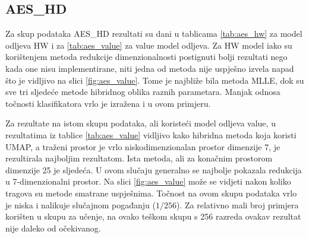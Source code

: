 \documentclass[times, utf8, diplomski]{fer}
\begin{document}
\subsection{AES\_HD}
Za skup podataka AES\_HD rezultati su dani u tablicama \ref{tab:aes_hw} za model odljeva HW i za \ref{tab:aes_value} za value model odljeva. Za HW model iako su korištenjem metoda redukcije dimenzionalnosti postignuti bolji rezultati nego kada one nisu implementirane, niti jedna od metoda nije uspješno izvela napad što je vidljivo na slici \ref{fig:aes_value}. Tome je najbliže bila metoda MLLE, dok su sve tri sljedeće metode hibridnog oblika raznih parametara. Manjak odnosa točnosti klasifikatora vrlo je izražena i u ovom primjeru.

Za rezultate na istom skupu podataka, ali koristeći model odljeva value, u rezultatima iz tablice \ref{tab:aes_value} vidljivo kako hibridna metoda koja koristi UMAP, a traženi prostor je vrlo niskodimenzionalan prostor dimenzije 7, je rezultirala najboljim rezultatom. Ista metoda, ali za konačnim prostorom dimenzije 25 je sljedeća. U ovom slučaju generalno se najbolje pokazala redukcija u 7-dimenzionalni prostor. Na slici \ref{fig:aes_value} može se vidjeti nakon koliko tragova su metode smatrane uspješnima. Točnost na ovom skupu podataka vrlo je niska i nalikuje slučajnom pogađanju ($1 / 256$). Za relativno mali broj primjera korišten u skupu za učenje, na ovako teškom skupu s 256 razreda ovakav rezultat nije daleko od očekivanog.
\end{document}
